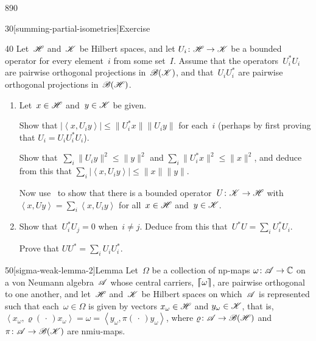 \begin{parsec}{890}
\begin{point}{30}[summing-partial-isometries]{Exercise}
\begin{point}{40}%
Let~$\mathscr{H}$ and~$\mathscr{K}$ be Hilbert spaces,
and 
let $U_i\colon \mathscr{H}\to\mathscr{K}$
be a bounded operator
for every element~$i$ from some set~$I$.
Assume that the operators~$U_i^*U_i$
are pairwise orthogonal projections in~$\mathscr{B}(\mathscr{K})$,
and that~$U_iU_i^*$ are pairwise orthogonal projections in~$\mathscr{B}(\mathscr{H})$.
\begin{enumerate}
\item
Let~$x\in\mathscr{H}$ and~$y\in\mathscr{K}$ be given.

Show that
$\left|\left<x,U_iy\right>\right|
\leq \|U_i^*x\| \|U_i y \|$
for each~$i$
(perhaps by first proving that  $U_i = U_i U_i^* U_i$).

Show that~$\sum_i \|U_i y\|^2 \leq \|y\|^2$
and $\sum_i \|U_i^* x\|^2\leq \|x\|^2$,
and deduce from this
that $\sum_i \left|\left<x,U_i y\right>\right| \leq \|x\|\|y\|$.

Now use~
to show that there is a bounded operator~$U\colon \mathscr{K}\to\mathscr{H}$
with $\left<x,Uy\right>
= \sum_i \left<x,U_iy\right>$
for all~$x\in\mathscr{H}$ and~$y\in \mathscr{K}$.
\item
Show that~$U_i^*U_j = 0$ when~$i\neq j$.
Deduce from this that~$U^*U = \sum_i U_i^* U_i$.

Prove that $UU^* = \sum_i U_iU_i^*$.
\end{enumerate}
\end{point}
\end{point}
\begin{point}{50}[sigma-weak-lemma-2]{Lemma}%
Let~$\Omega$ be a collection of np-maps $\omega\colon \mathscr{A}\to\mathbb{C}$
on a von Neumann algebra~$\mathscr{A}$ 
whose central carriers,  $\left\lceil\!\!\left\lceil\omega\right\rceil\!\!\right\rceil$, are pairwise orthogonal to one another,
and let~$\mathscr{H}$ and~$\mathscr{K}$ be Hilbert spaces
on which~$\mathscr{A}$ is represented such
that each~$\omega\in\Omega$ 
is given by vectors $x_\omega\in\mathscr{H}$ and $y_\omega\in\mathscr{K}$,
that is,
$\left<x_\omega,\varrho(\,\cdot\,)x_\omega\right>
=\omega = \left<y_\omega,\pi(\,\cdot\,)y_\omega\right>$,
where $\varrho\colon \mathscr{A}\to\mathscr{B}(\mathscr{H})$
and $\pi\colon \mathscr{A}\to\mathscr{B}(\mathscr{K})$
are nmiu-maps.


\end{point}
\end{parsec}
